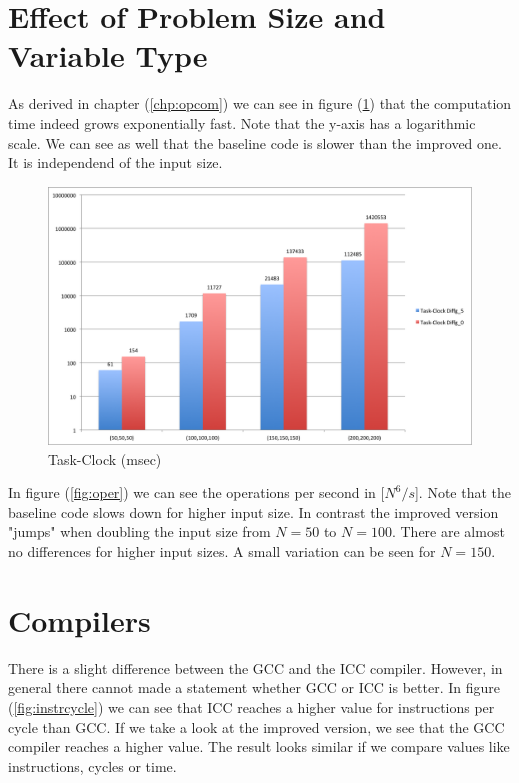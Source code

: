 \documentclass[12pt,a4paper]{article}
\begin{document}
\section{Effect of Problem Size and Variable Type}

As derived in chapter (\ref{chp:opcom}) we can see in figure (\ref{fig:clock}) that the computation time indeed grows exponentially fast. Note that the y-axis has a logarithmic scale. We can see as well that the baseline code is slower than the improved one. It is independend of the input size.

\begin{figure}[h]
	\centering
	\includegraphics[width=1.0\linewidth]{"Benchmark 2/clock"}
	\caption{Task-Clock (msec)}
	\label{fig:clock}
\end{figure}

In figure (\ref{fig:oper}) we can see the operations per second in [$N^6/s$]. Note that the baseline code slows down for higher input size. In contrast the improved version "jumps" when doubling the input size from $N=50$ to $N=100$. There are almost no differences for higher input sizes. A small variation can be seen for $N=150$.

\section{Compilers}

There is a slight difference between the GCC and the ICC compiler. However, in general there cannot made a statement whether GCC or ICC is better. In figure (\ref{fig:instrcycle}) we can see that ICC reaches a higher value for instructions per cycle than GCC. If we take a look at the improved version, we see that the GCC compiler reaches a higher value. The result looks similar if we compare values like instructions, cycles or time.
\end{document}
